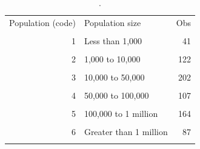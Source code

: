 \begin{table}[htbp]\centering
\caption{.}
\label{tab:bin_counts_population_2020}
\begin{tabular}{rlr}\toprule
Population (code) & Population size & Obs \\\\ \midrule
1 & Less than 1,000 & 41 \\\\
2 & 1,000 to 10,000 & 122 \\\\
3 & 10,000 to 50,000 & 202 \\\\
4 & 50,000 to 100,000 & 107 \\\\
5 & 100,000 to 1 million & 164 \\\\
6 & Greater than 1 million & 87 \\\\
\bottomrule\end{tabular}\end{table}
